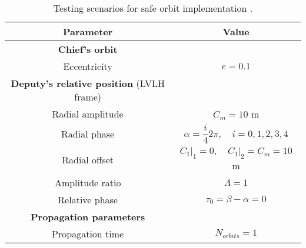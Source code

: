 \begin{table}[!htb]
\begin{center}
\begin{tabular}{|c|c|}
\hline 
\hline
\rowcolor{Gray!30}
\textbf{Parameter} & \textbf{Value} \\
\hline 
\hline 
\rowcolor{Gray!10} \textbf{Chief's orbit} &   \\
\hline
 Eccentricity & $e = 0.1$ \\
\hline 
\rowcolor{Gray!10}\textbf{Deputy's relative position} (LVLH frame) &   \\
\hline
 Radial amplitude 	& $C_m = 10$ m \\[1em]
 Radial phase 		& $\alpha = \dfrac{i}{4} 2\pi, \quad i = 0, 1, 2, 3, 4$ \\[1em]
 Radial offset 		& $\left. C_1\right\rvert_{1} = 0, \quad \left. C_1\right\rvert_{2} = C_m = 10 $ m \\[1em]
 Amplitude ratio 	& $\Lambda = 1$ \\[1em]
 Relative phase 		& $\tau_0 = \beta - \alpha = 0$  \\[1em]
\hline 
\rowcolor{Gray!10}\textbf{Propagation parameters} &  \\
\hline 
 Propagation time & $N_{orbits} = 1$  \\
\hline 
\end{tabular} 
\end{center}
\caption{Testing scenarios for safe orbit implementation \cite{Peters_Noomen}.}
\label{tabCh3:Scenarios_safe_orbits}
\end{table}
%
\FloatBarrier
%
